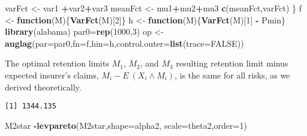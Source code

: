 \documentclass[]{book}
\newenvironment{Shaded}{\begin{snugshade}}{\end{snugshade}}
\newcommand{\KeywordTok}[1]{\textcolor[rgb]{0.13,0.29,0.53}{\textbf{#1}}}
\newcommand{\DataTypeTok}[1]{\textcolor[rgb]{0.13,0.29,0.53}{#1}}
\newcommand{\DecValTok}[1]{\textcolor[rgb]{0.00,0.00,0.81}{#1}}
\newcommand{\StringTok}[1]{\textcolor[rgb]{0.31,0.60,0.02}{#1}}
\newcommand{\OtherTok}[1]{\textcolor[rgb]{0.56,0.35,0.01}{#1}}
\newcommand{\ControlFlowTok}[1]{\textcolor[rgb]{0.13,0.29,0.53}{\textbf{#1}}}
\newcommand{\OperatorTok}[1]{\textcolor[rgb]{0.81,0.36,0.00}{\textbf{#1}}}
\newcommand{\NormalTok}[1]{#1}
\theoremstyle{definition}
\theoremstyle{definition}
\theoremstyle{definition}
\theoremstyle{remark}
\begin{document}
\begin{Shaded}
\begin{Highlighting}[]
\NormalTok{  varFct <-}\StringTok{ }\NormalTok{var1 }\OperatorTok{+}\NormalTok{var2}\OperatorTok{+}\NormalTok{var3}
\NormalTok{  meanFct <-}\StringTok{ }\NormalTok{mu1}\OperatorTok{+}\NormalTok{mu2}\OperatorTok{+}\NormalTok{mu3}
  \KeywordTok{c}\NormalTok{(meanFct,varFct)}
\NormalTok{  \}}
\NormalTok{f <-}\StringTok{ }\ControlFlowTok{function}\NormalTok{(M)\{}\KeywordTok{VarFct}\NormalTok{(M)[}\DecValTok{2}\NormalTok{]\}}
\NormalTok{h <-}\StringTok{ }\ControlFlowTok{function}\NormalTok{(M)\{}\KeywordTok{VarFct}\NormalTok{(M)[}\DecValTok{1}\NormalTok{] }\OperatorTok{-}\StringTok{ }\NormalTok{Pmin\}}
\KeywordTok{library}\NormalTok{(alabama)}
\NormalTok{par0=}\KeywordTok{rep}\NormalTok{(}\DecValTok{1000}\NormalTok{,}\DecValTok{3}\NormalTok{)}
\NormalTok{op <-}\StringTok{ }\KeywordTok{auglag}\NormalTok{(}\DataTypeTok{par=}\NormalTok{par0,}\DataTypeTok{fn=}\NormalTok{f,}\DataTypeTok{hin=}\NormalTok{h,}\DataTypeTok{control.outer=}\KeywordTok{list}\NormalTok{(}\DataTypeTok{trace=}\OtherTok{FALSE}\NormalTok{))}
\end{Highlighting}
\end{Shaded}

The optimal retention limits \(M_1\), \(M_2\), and \(M_3\) resulting
retention limit minus expected insurer's claims,
\(M_i - E ~(X_i \wedge M_i)\), is the same for all risks, as we derived
theoretically.

\begin{Shaded}
\end{Shaded}

\begin{verbatim}
[1] 1344.135
\end{verbatim}

\begin{Shaded}
\begin{Highlighting}[]
\NormalTok{M2star }\OperatorTok{-}\KeywordTok{levpareto}\NormalTok{(M2star,}\DataTypeTok{shape=}\NormalTok{alpha2, }\DataTypeTok{scale=}\NormalTok{theta2,}\DataTypeTok{order=}\DecValTok{1}\NormalTok{)}
\end{Highlighting}
\end{Shaded}
\end{document}
